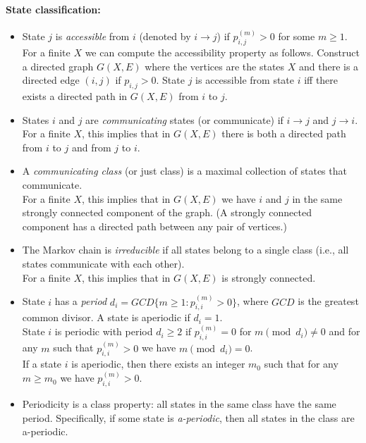 \paragraph{State classification:}

\begin{itemize}
\item State $j$ is \textit{accessible} from $i$  (denoted by $i \to j$) if $p_{i,j}^{(m)} > 0$ for some $m \ge
1$.\\
For a finite $X$  we can compute the accessibility property as
follows. Construct a directed graph $G(X,E)$ where the vertices are
the states $X$ and there is a directed edge $(i,j)$ if $p_{i,j}>0$.
State $j$ is accessible from state $i$ iff there exists a directed
path in $G(X,E)$ from $i$ to $j$.
\item States $i$ and $j$ are \textit{communicating} states (or communicate) if $i \to j$ and $j \to
i$.\\
For a finite $X$, this implies that in $G(X,E)$ there is both a
directed path from $i$ to $j$ and from $j$ to $i$.
\item A \textit{communicating class} (or just
class) is a maximal collection of states that communicate.\\
For a finite $X$, this implies that in $G(X,E)$ we have $i$ and $j$
in the same strongly connected component of the graph. (A strongly
connected component has a directed path between any pair of
vertices.)
\item The Markov chain is
\textit{irreducible} if all states belong to a single class (i.e.,
all states communicate with each other).\\
For a finite $X$, this implies that in $G(X,E)$ is strongly
connected.
\item
State $i$ has a \textit{period} $d_i=GCD \{m\geq
1:p_{i,i}^{(m)}>0\}$, where $GCD$ is the greatest common divisor. A
state is aperiodic if $d_i=1$.\\
State $i$ is periodic with period $d_i \ge 2$ if  $p_{i,i}^{(m)} =
0$ for $m \pmod {d_i} \neq 0$ and for any $m$ such that
$p_{i,i}^{(m)} > 0$ we have $m \pmod {d_i} =0$.\\
If a state $i$ is aperiodic, then there exists an integer $m_0$ such
that for any $m\geq m_0$ we have $p_{i,i}^{(m)}>0$.
\item
Periodicity is a class property: all states in the same class
have the same period. Specifically, if some state is
\textit{a-periodic},
then all states in the class are a-periodic.\\

\end{itemize}
